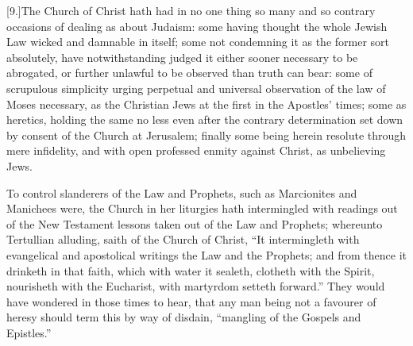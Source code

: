 [9.]The Church of Christ hath had in no one thing so many and so contrary occasions of dealing as about Judaism: some having thought the whole Jewish Law wicked and damnable in itself; some not condemning it as the former sort absolutely, have notwithstanding judged it either sooner necessary to be abrogated, or further unlawful to be observed than truth can bear: some of scrupulous simplicity urging perpetual and universal observation of the law of Moses necessary,  as the Christian Jews at the first in the Apostles’ times; some as heretics, holding the same no less even after the contrary determination set down by consent of the Church at Jerusalem; finally some being herein resolute through mere infidelity, and with open professed enmity against Christ, as unbelieving Jews.

To control slanderers of the Law and Prophets, such as Marcionites and Manichees were, the Church in her liturgies hath intermingled with readings out of the New Testament lessons taken out of the Law and Prophets; whereunto Tertullian alluding, saith of the Church of Christ, “It intermingleth with evangelical and apostolical writings the Law and the Prophets; and from thence it drinketh in that faith, which with water it sealeth, clotheth with the Spirit, nourisheth with the Eucharist, with martyrdom setteth forward.” They would have wondered in those times to hear, that any man being not a favourer of heresy should term this by way of disdain, “mangling of the Gospels and Epistles.”

